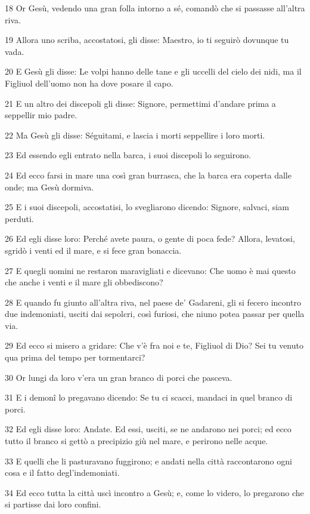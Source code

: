 \par 18 Or Gesù, vedendo una gran folla intorno a sé, comandò che si passasse all'altra riva.
\par 19 Allora uno scriba, accostatosi, gli disse: Maestro, io ti seguirò dovunque tu vada.
\par 20 E Gesù gli disse: Le volpi hanno delle tane e gli uccelli del cielo dei nidi, ma il Figliuol dell'uomo non ha dove posare il capo.
\par 21 E un altro dei discepoli gli disse: Signore, permettimi d'andare prima a seppellir mio padre.
\par 22 Ma Gesù gli disse: Séguitami, e lascia i morti seppellire i loro morti.
\par 23 Ed essendo egli entrato nella barca, i suoi discepoli lo seguirono.
\par 24 Ed ecco farsi in mare una così gran burrasca, che la barca era coperta dalle onde; ma Gesù dormiva.
\par 25 E i suoi discepoli, accostatisi, lo svegliarono dicendo: Signore, salvaci, siam perduti.
\par 26 Ed egli disse loro: Perché avete paura, o gente di poca fede? Allora, levatosi, sgridò i venti ed il mare, e si fece gran bonaccia.
\par 27 E quegli uomini ne restaron maravigliati e dicevano: Che uomo è mai questo che anche i venti e il mare gli obbediscono?
\par 28 E quando fu giunto all'altra riva, nel paese de' Gadareni, gli si fecero incontro due indemoniati, usciti dai sepolcri, così furiosi, che niuno potea passar per quella via.
\par 29 Ed ecco si misero a gridare: Che v'è fra noi e te, Figliuol di Dio? Sei tu venuto qua prima del tempo per tormentarci?
\par 30 Or lungi da loro v'era un gran branco di porci che pasceva.
\par 31 E i demonî lo pregavano dicendo: Se tu ci scacci, mandaci in quel branco di porci.
\par 32 Ed egli disse loro: Andate. Ed essi, usciti, se ne andarono nei porci; ed ecco tutto il branco si gettò a precipizio giù nel mare, e perirono nelle acque.
\par 33 E quelli che li pasturavano fuggirono; e andati nella città raccontarono ogni cosa e il fatto degl'indemoniati.
\par 34 Ed ecco tutta la città uscì incontro a Gesù; e, come lo videro, lo pregarono che si partisse dai loro confini.


